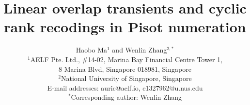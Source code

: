 \documentclass[12pt,a4paper]{article}
\title{Linear overlap transients and cyclic rank recodings in Pisot
numeration}
\author{Haobo Ma$^{1}$ and Wenlin Zhang$^{2,*}$\\[4pt]
{\small $^1$AELF Pte. Ltd., \#14-02, Marina Bay Financial Centre Tower 1,}\\
{\small 8 Marina Blvd, Singapore 018981, Singapore}\\
{\small $^2$National University of Singapore, Singapore}\\[2pt]
{\small E-mail addresses: auric@aelf.io, e1327962@u.nus.edu}\\
{\small $^*$Corresponding author: Wenlin Zhang}}
\date{}
\theoremstyle{definition}
\theoremstyle{plain}
\theoremstyle{remark}
\numberwithin{equation}{section}
\begin{document}
\linenumbers
\maketitle










\end{document}
